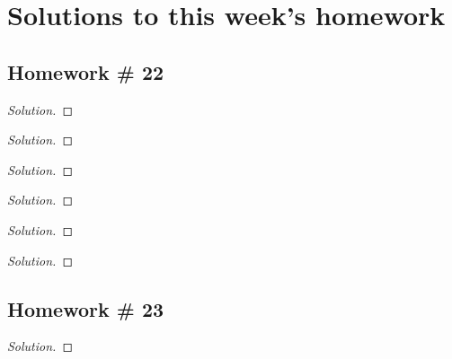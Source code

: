 \chapter{Solutions to this week's homework}
\section{Homework \# 22}
\begin{problem}[WebAssign HW \# 22, \#]

\end{problem}
\begin{proof}[Solution]
\end{proof}

\begin{problem}[WebAssign HW \# 22, \#]
\end{problem}
\begin{proof}[Solution]
\end{proof}

\begin{problem}[WebAssign HW \# 22, \#]
\end{problem}
\begin{proof}[Solution]
\end{proof}

\begin{problem}[WebAssign HW \# 22, \#]
\end{problem}
\begin{proof}[Solution]
\end{proof}

\begin{problem}[WebAssign HW \# 22, \#]
\end{problem}
\begin{proof}[Solution]
\end{proof}

\begin{problem}[WebAssign HW \# 22, \#]
\end{problem}
\begin{proof}[Solution]
\end{proof}

\section{Homework \# 23}
\begin{problem}[WebAssign HW \# 23, \#]
\end{problem}
\begin{proof}[Solution]
\end{proof}

